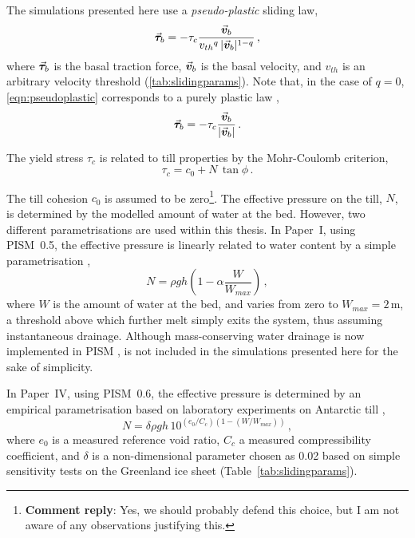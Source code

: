 \documentclass{article}
\newcommand{\renote}[1]{\footnote{\textbf{Comment reply}: #1}}
\newcommand{\vect}[1]{\va*{#1}} %
\newcommand{\vv}[0]{\vect{v}}           %
\newcommand{\CCLI}[0]{Paper~I}      %
\newcommand{\CCYC}[0]{Paper~IV}     %
\begin{document}
The simulations presented here use a \emph{pseudo-plastic} sliding law,
\begin{equation}
    \label{eqn:pseudoplastic}
    \vect{\tau}_b = -\tau_c \frac{\vv_b}{{v_{th}}^q\,|\vv_b|^{1-q}} \,,
\end{equation}
where $\vect{\tau}_b$ is the basal traction force, $\vv_b$ is the basal
velocity, and $v_{th}$ is an arbitrary velocity threshold
(\cref{tab:slidingparams}). Note that, in the case of
$q=0$, \cref{eqn:pseudoplastic} corresponds to a purely plastic law
\citep[Eq.~11]{Winkelmann.etal.2011},
\begin{equation}
    \label{eqn:plastic}
    \vect{\tau}_b = -\tau_c \frac{\vv_b}{|\vv_b|} \,.
\end{equation}

The yield stress $\tau_c$ is related to till properties by the Mohr-Coulomb
criterion,
\begin{equation}
    \label{eqn:coulomb}
    \tau_c = c_0 + N\,\tan{\phi} \,.
\end{equation}

The till cohesion $c_0$ is assumed to be zero\renote{
  Yes, we should probably defend this choice, but I am not aware of any
  observations justifying this.}.
The effective pressure on the
till, $N$, is determined by the modelled amount of water at the bed. However,
two different parametrisations are used within this thesis. In {\CCLI}, using
PISM~0.5, the effective pressure is linearly related to water content by a
simple parametrisation \citep[Eq.~13]{Winkelmann.etal.2011},
\begin{equation}
    N = \rho gh (1 - \alpha \frac{W}{W_{max}}) \,,
\end{equation}
where $W$ is the amount of water at the bed, and varies from zero to
$W_{max}=2$\,m, a threshold above which further melt simply exits the system,
thus assuming instantaneous drainage. Although mass-conserving water drainage
is now implemented in PISM \citep{Bueler.Pelt.2014}, is not included in the
simulations presented here for the sake of simplicity.

In {\CCYC}, using PISM~0.6, the effective pressure is determined by an
empirical parametrisation based on laboratory experiments on Antarctic till
\citep{Tulaczyk.etal.2000, Bueler.Pelt.2014},
\begin{equation}
    N = \delta \rho gh \, 10^{(e_0/C_c) (1 - (W/W_{max}))} \,,
\end{equation}
where $e_0$ is a measured reference void ratio, $C_c$ a measured
compressibility coefficient, and $\delta$ is a non-dimensional parameter
chosen as 0.02 based on simple sensitivity tests on the Greenland ice sheet
(Table~\ref{tab:slidingparams}).
\end{document}
